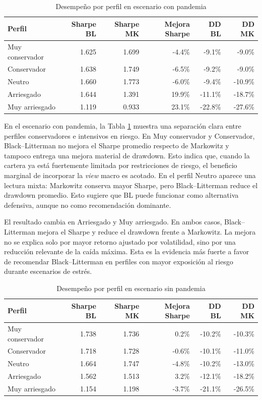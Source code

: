 \documentclass[11pt]{article}
\begin{document}
\begin{table}[H]
\centering
\caption{Desempe\~no por perfil en escenario con pandemia}
\label{tab:perfiles_con_pandemia}
\begin{tabular}{l r r r r r}
\toprule
Perfil & Sharpe BL & Sharpe MK & Mejora Sharpe & DD BL & DD MK \\
\midrule
Muy conservador & 1.625 & 1.699 & -4.4\% & -9.1\% & -9.0\% \\
Conservador & 1.638 & 1.749 & -6.5\% & -9.2\% & -9.0\% \\
Neutro & 1.660 & 1.773 & -6.0\% & -9.4\% & -10.9\% \\
Arriesgado & 1.644 & 1.391 & 19.9\% & -11.1\% & -18.7\% \\
Muy arriesgado & 1.119 & 0.933 & 23.1\% & -22.8\% & -27.6\% \\
\bottomrule
\end{tabular}
\end{table}

En el escenario con pandemia, la Tabla \ref{tab:perfiles_con_pandemia} muestra una separaci\'on clara entre perfiles conservadores e intensivos en riesgo. En Muy conservador y Conservador, Black--Litterman no mejora el Sharpe promedio respecto de Markowitz y tampoco entrega una mejora material de drawdown. Esto indica que, cuando la cartera ya est\'a fuertemente limitada por restricciones de riesgo, el beneficio marginal de incorporar la \textit{view} macro es acotado. En el perfil Neutro aparece una lectura mixta: Markowitz conserva mayor Sharpe, pero Black--Litterman reduce el drawdown promedio. Esto sugiere que BL puede funcionar como alternativa defensiva, aunque no como recomendaci\'on dominante.

El resultado cambia en Arriesgado y Muy arriesgado. En ambos casos, Black--Litterman mejora el Sharpe y reduce el drawdown frente a Markowitz. La mejora no se explica solo por mayor retorno ajustado por volatilidad, sino por una reducci\'on relevante de la ca\'ida m\'axima. Esta es la evidencia m\'as fuerte a favor de recomendar Black--Litterman en perfiles con mayor exposici\'on al riesgo durante escenarios de estr\'es.

\begin{table}[H]
\centering
\caption{Desempe\~no por perfil en escenario sin pandemia}
\label{tab:perfiles_sin_pandemia}
\begin{tabular}{l r r r r r}
\toprule
Perfil & Sharpe BL & Sharpe MK & Mejora Sharpe & DD BL & DD MK \\
\midrule
Muy conservador & 1.738 & 1.736 & 0.2\% & -10.2\% & -10.3\% \\
Conservador & 1.718 & 1.728 & -0.6\% & -10.1\% & -11.0\% \\
Neutro & 1.664 & 1.747 & -4.8\% & -10.2\% & -13.0\% \\
Arriesgado & 1.562 & 1.513 & 3.2\% & -12.1\% & -18.2\% \\
Muy arriesgado & 1.154 & 1.198 & -3.7\% & -21.1\% & -26.5\% \\
\bottomrule
\end{tabular}
\end{table}
\end{document}
